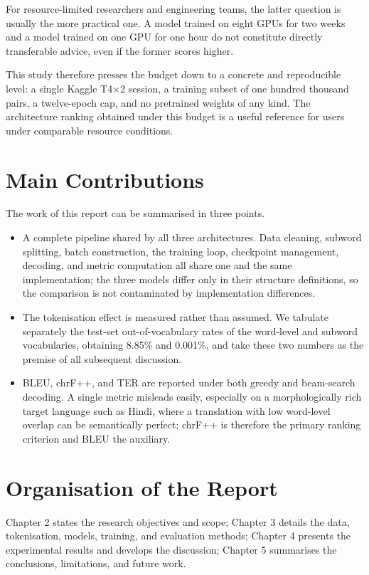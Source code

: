 \documentclass[a4paper,12pt]{vpcoe}
\begin{document}
For resource-limited researchers and engineering teams, the latter question is usually the more practical one. A model trained on eight GPUs for two weeks and a model trained on one GPU for one hour do not constitute directly transferable advice, even if the former scores higher.

This study therefore presses the budget down to a concrete and reproducible level: a single Kaggle T4$\times$2 session, a training subset of one hundred thousand pairs, a twelve-epoch cap, and no pretrained weights of any kind. The architecture ranking obtained under this budget is a useful reference for users under comparable resource conditions.

\section{Main Contributions}
The work of this report can be summarised in three points.
\begin{itemize}
  \item A complete pipeline shared by all three architectures. Data cleaning, subword splitting, batch construction, the training loop, checkpoint management, decoding, and metric computation all share one and the same implementation; the three models differ only in their structure definitions, so the comparison is not contaminated by implementation differences.
  \item The tokenisation effect is measured rather than assumed. We tabulate separately the test-set out-of-vocabulary rates of the word-level and subword vocabularies, obtaining 8.85\% and 0.001\%, and take these two numbers as the premise of all subsequent discussion.
  \item BLEU, chrF++, and TER are reported under both greedy and beam-search decoding. A single metric misleads easily, especially on a morphologically rich target language such as Hindi, where a translation with low word-level overlap can be semantically perfect; chrF++ is therefore the primary ranking criterion and BLEU the auxiliary.
\end{itemize}

\section{Organisation of the Report}
Chapter 2 states the research objectives and scope; Chapter 3 details the data, tokenisation, models, training, and evaluation methods; Chapter 4 presents the experimental results and develops the discussion; Chapter 5 summarises the conclusions, limitations, and future work.
\end{document}
